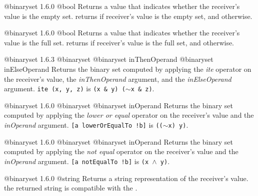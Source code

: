 {@binaryset}
{1.6.0}
{@bool}
{Returns a  value that indicates whether the receiver's value is the empty set.}
{returns  if receiver's value is the empty set, and  otherwise.}







{@binaryset}
{1.6.0}
{@bool}
{Returns a  value that indicates whether the receiver's value is the full set.}
{returns  if receiver's value is the full set, and  otherwise.}







{@binaryset}
{1.6.3}
{@binaryset}
{@binaryset inThenOperand}
{@binaryset inElseOperand}
{Returns the binary set computed by applying the \emph{ite} operator on the receiver's value, the \emph{inThenOperand} argument, and the  \emph{inElseOperand} argument.}
{\texttt{ite (x, y, z)} is \texttt{(x \& y) \textbar ($\sim$x \& z)}.}







{@binaryset}
{1.6.0}
{@binaryset}
{@binaryset inOperand}
{Returns the binary set computed by applying the \emph{lower or equal} operator on the receiver's value and the \emph{inOperand} argument.}
{\texttt{[a lowerOrEqualTo !b]} is \texttt{(($\sim$x) \textbar y)}.}







{@binaryset}
{1.6.0}
{@binaryset}
{@binaryset inOperand}
{Returns the binary set computed by applying the \emph{not equal} operator on the receiver's value and the \emph{inOperand} argument.}
{\texttt{[a notEqualTo !b]} is \texttt{(x $\wedge$ y)}.}







{@binaryset}
{1.6.0}
{@string}
{Returns a string representation of the receiver's value.}
{the returned string is compatible with the .}







